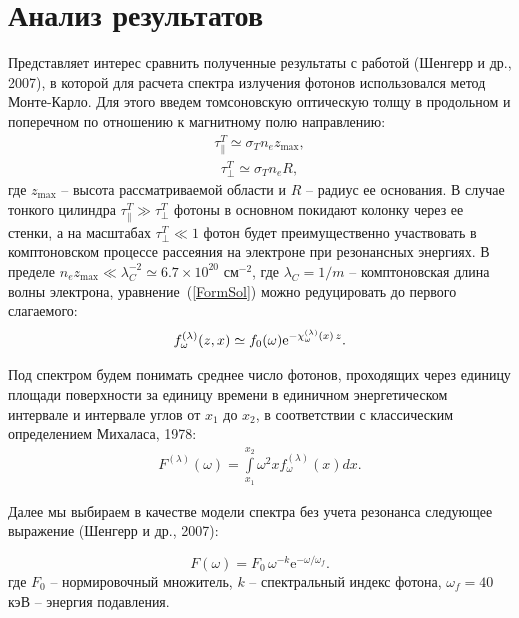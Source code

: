 \documentclass{pazh2col-win}
\newcommand{\eee}{\mathrm{e}} %
\begin{document}
\section{Анализ результатов}
\label{section_B}

Представляет интерес сравнить полученные результаты с работой (Шенгерр и др., 2007), в которой для расчета спектра излучения фотонов использовался метод Монте-Карло. Для этого введем томсоновскую оптическую толщу в продольном и поперечном по отношению к магнитному полю направлению:
%
\begin{eqnarray}
\tau_\parallel^T \simeq  \sigma_T n_e z_{\mathrm{max}},
\end{eqnarray}
%
\begin{eqnarray}
\tau_{\perp}^T \simeq  \sigma_T n_e R,
\end{eqnarray}
%
где $z_{\mathrm{max}}$ -- высота рассматриваемой области и $R$ -- радиус ее основания. В случае тонкого цилиндра $\tau_\parallel^T \gg \tau_\perp^T$ фотоны в основном покидают колонку через ее стенки, а на масштабах $\tau_\perp^T \ll 1$ фотон будет преимущественно участвовать в комптоновском процессе рассеяния на электроне при резонансных энергиях. В пределе \linebreak $n_e z_{\mathrm{max}} \ll \lambda_C^{-2} \simeq 6.7\times 10^{20}$ см$^{-2}$, где $\lambda_C = 1 / m$ -- комптоновская длина волны электрона, уравнение~(\ref{FormSol}) можно редуцировать до первого слагаемого: 
\begin{equation}
\label{Solution}
f_\omega^{(\lambda)}(z,x) \simeq f_0(\omega) \eee^{-{\cal \chi}_\omega^{(\lambda)}(x)\, z}.
\end{equation}

Под спектром будем понимать среднее число фотонов, проходящих через единицу площади поверхности за единицу времени в единичном энергетическом интервале и интервале углов от $x_1$ до $x_2$, в соответствии с классическим определением Михаласа, 1978:
\begin{eqnarray}
	F^{(\lambda)}(\omega) = \int\limits_{x_1}^{x_2} \omega^2 x f^{(\lambda)}_\omega (x) dx.
\end{eqnarray}

Далее мы выбираем в качестве модели спектра без учета резонанса следующее выражение (Шенгерр и др., 2007):
%

%
\begin{equation}
\label{without_resonance}
F(\omega) = F_0\,\omega^{-k} \eee^{-\omega/\omega_f}.
\end{equation}
%
где $F_0$ -- нормировочный множитель, $k$ -- спектральный индекс фотона,  $\omega_f = 40$ кэВ -- энергия подавления.
\end{document}
